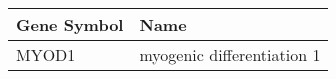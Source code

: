 \begin{tabular}{ll}
\toprule
Gene Symbol &                       Name \\
\midrule
      MYOD1 & myogenic differentiation 1 \\
\bottomrule
\end{tabular}
